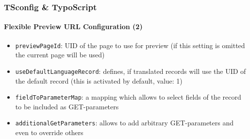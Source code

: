 \begin{frame}[fragile]
	\frametitle{TSconfig \& TypoScript}
	\framesubtitle{Flexible Preview URL Configuration (2)}

	\begin{itemize}
		\item \texttt{previewPageId}:\newline
			\smaller
				UID of the page to use for preview\newline
				(if this setting is omitted the current page will be used)
			\normalsize
		\item \texttt{useDefaultLanguageRecord}:\newline
			\smaller
				defines, if translated records will use the UID of the default record\newline
				(this is activated by default, value: 1)
			\normalsize
		\item \texttt{fieldToParameterMap}:\newline
			\smaller
				a mapping which allows to select fields of the record to be included as GET-parameters
			\normalsize
		\item \texttt{additionalGetParameters}:\newline
			\smaller
				allows to add arbitrary GET-parameters and even to override others
			\normalsize
	\end{itemize}

\end{frame}

